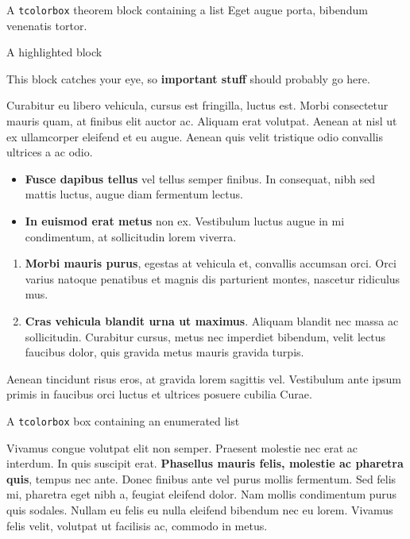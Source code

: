 \documentclass[final]{beamer}
\newlength{\colwidth}
\begin{document}
\begin{frame}[t]
\begin{columns}[t]
\begin{column}{\colwidth}
\begin{thm}{A \texttt{tcolorbox} theorem block containing a list}{}
				Eget augue porta, bibendum venenatis tortor.
				
			\end{thm}
			
			\begin{alertblock}{A highlighted block}
				
				This block catches your eye, so \textbf{important stuff} should probably go
				here.
				
				Curabitur eu libero vehicula, cursus est fringilla, luctus est. Morbi
				consectetur mauris quam, at finibus elit auctor ac. Aliquam erat volutpat.
				Aenean at nisl ut ex ullamcorper eleifend et eu augue. Aenean quis velit
				tristique odio convallis ultrices a ac odio.
				
				\begin{itemize}
					\item \textbf{Fusce dapibus tellus} vel tellus semper finibus. In
					consequat, nibh sed mattis luctus, augue diam fermentum lectus.
					\item \textbf{In euismod erat metus} non ex. Vestibulum luctus augue in
					mi condimentum, at sollicitudin lorem viverra.
				\end{itemize}
			
				\begin{enumerate}
					\item \textbf{Morbi mauris purus}, egestas at vehicula et, convallis
					accumsan orci. Orci varius natoque penatibus et magnis dis parturient
					montes, nascetur ridiculus mus.
					\item \textbf{Cras vehicula blandit urna ut maximus}. Aliquam blandit nec
					massa ac sollicitudin. Curabitur cursus, metus nec imperdiet bibendum,
					velit lectus faucibus dolor, quis gravida metus mauris gravida turpis.
				\end{enumerate}
				
				Aenean tincidunt risus eros, at gravida lorem sagittis vel. Vestibulum ante
				ipsum primis in faucibus orci luctus et ultrices posuere cubilia Curae.
				
			\end{alertblock}
			
			\begin{defbox}{A \texttt{tcolorbox} box containing an enumerated list}{}
				
				Vivamus congue volutpat elit non semper. Praesent molestie nec erat ac
				interdum. In quis suscipit erat. \textbf{Phasellus mauris felis, molestie
					ac pharetra quis}, tempus nec ante. Donec finibus ante vel purus mollis
				fermentum. Sed felis mi, pharetra eget nibh a, feugiat eleifend dolor. Nam
				mollis condimentum purus quis sodales. Nullam eu felis eu nulla eleifend
				bibendum nec eu lorem. Vivamus felis velit, volutpat ut facilisis ac,
				commodo in metus.
				

\end{defbox}
\end{column}
\end{columns}
\end{frame}
\end{document}
